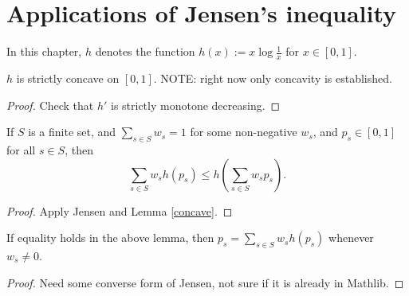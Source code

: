 \chapter{Applications of Jensen's inequality}

In this chapter, $h$ denotes the function $h(x) := x \log \frac{1}{x}$ for $x \in [0,1]$.

\begin{lemma}[Concavity]\label{concave}
  $h$ is strictly concave on $[0,1]$. NOTE: right now only concavity is established.
\end{lemma}

\begin{proof} Check that $h'$ is strictly monotone decreasing.
\end{proof}

\begin{lemma}[Jensen]\label{jensen}
   \leanok
  If $S$ is a finite set, and $\sum_{s \in S} w_s = 1$ for some non-negative $w_s$, and $p_s \in [0,1]$ for all $s \in S$, then
  $$ \sum_{s \in S} w_s h(p_s) \leq h(\sum_{s \in S} w_s p_s).$$
\end{lemma}

\begin{proof} \leanok Apply Jensen and Lemma \ref{concave}.
\end{proof}

\begin{lemma}\label{converse-jensen}
If equality holds in the above lemma, then $p_s = \sum_{s \in S} w_s h(p_s)$ whenever $w_s \neq 0$.
\end{lemma}

\begin{proof}  Need some converse form of Jensen, not sure if it is already in Mathlib.
\end{proof}
